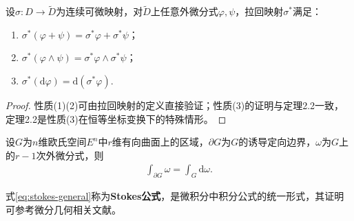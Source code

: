 \documentclass[../../main.tex]{subfiles}%
\begin{document}
\begin{theorem}
设$\sigma:D\to\tilde{D}$为连续可微映射，对$\tilde{D}$上任意外微分式$\varphi,\psi$，拉回映射$\sigma^*$满足：
\begin{enumerate}[(1)]
\item $\sigma^*(\varphi+\psi)=\sigma^*\varphi+\sigma^*\psi$；
\item $\sigma^*(\varphi\land\psi)=\sigma^*\varphi\land\sigma^*\psi$；
\item $\sigma^*(\mathrm{d}\varphi)=\mathrm{d}(\sigma^*\varphi)$.
\end{enumerate}
\end{theorem}
\begin{proof}
性质(1)(2)可由拉回映射的定义直接验证；性质(3)的证明与定理2.2一致，定理2.2是性质(3)在恒等坐标变换下的特殊情形。
\end{proof}

\begin{theorem}
设$G$为$n$维欧氏空间$E^n$中$r$维有向曲面上的区域，$\partial G$为$G$的诱导定向边界，$\omega$为$G$上的$r-1$次外微分式，则
\begin{align}
\int_{\partial G}\omega = \int_G\mathrm{d}\omega. \label{eq:stokes-general}
\end{align}
\end{theorem}
\begin{remark}
式\eqref{eq:stokes-general}称为\textbf{Stokes公式}，是微积分中积分公式的统一形式，其证明可参考微分几何相关文献。
\end{remark}
\end{document}
